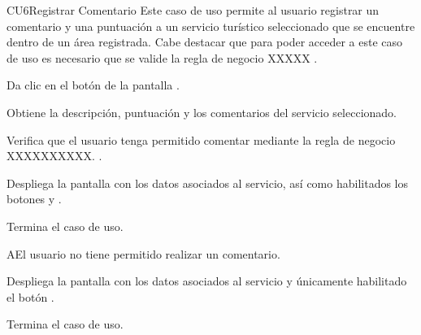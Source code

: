 
% 



	\begin{UseCase}{CU6}{Registrar Comentario}{
		Este caso de uso permite al usuario registrar un comentario y una puntuación a un servicio turístico seleccionado que se encuentre dentro de un área registrada. Cabe destacar que para poder acceder a este caso de uso es necesario que se valide la regla de negocio XXXXX .
	}
	\end{UseCase}
	\begin{UCtrayectoria} 
		
		\UCpaso[\UCactor] Da clic en el botón  de la pantalla  .
		
		\UCpaso Obtiene la descripción, puntuación y los comentarios del servicio seleccionado.
		
		\UCpaso Verifica que el usuario tenga permitido comentar mediante la regla de negocio XXXXXXXXXX. .
		
		\UCpaso Despliega la pantalla  con los datos asociados al servicio, así como habilitados los botones  y .
		
		\UCpaso[] Termina el caso de uso.
		
	\end{UCtrayectoria}

		\begin{UCtrayectoriaA}{A}{El usuario no tiene permitido realizar un comentario.}
			
		\UCpaso Despliega la pantalla  con los datos asociados al servicio y únicamente habilitado el botón .
		
		\UCpaso[] Termina el caso de uso.
		
	\end{UCtrayectoriaA}
	
	